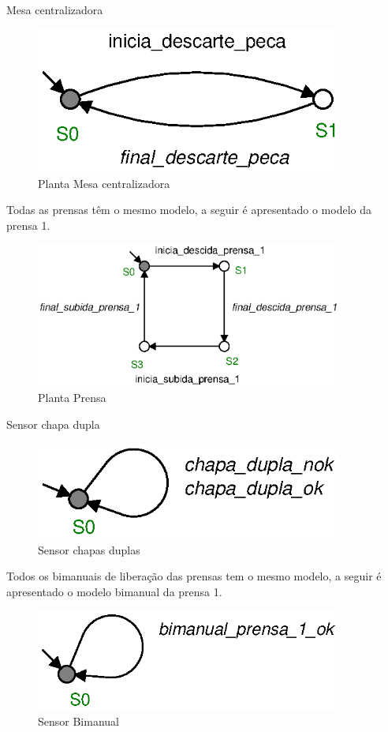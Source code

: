 Mesa centralizadora
\begin{figure}[H]%
    \centering
    \includegraphics[width=0.9\textwidth]{imagens/mesa_centralizadora.eps}
    \caption{Planta Mesa centralizadora}\label{fig:mesa}
\end{figure}

Todas as prensas têm o mesmo modelo, a seguir é apresentado o modelo da prensa 1.
\begin{figure}[H]%
    \centering
    \includegraphics[width=0.9\textwidth]{imagens/prensa_1.eps}
    \caption{Planta Prensa}\label{fig:prensa}
\end{figure}

Sensor chapa dupla
\begin{figure}[H]%
    \centering
    \includegraphics[width=0.9\textwidth]{imagens/sensor_chapa_dupla.eps}
    \caption{Sensor chapas duplas}\label{fig:chapadupla}
\end{figure}

Todos os bimanuais de liberação das prensas tem o mesmo modelo, a seguir é apresentado o modelo bimanual da prensa 1.
\begin{figure}[H]%
    \centering
    \includegraphics[width=0.9\textwidth]{imagens/bimanual_prensa_1.eps}
    \caption{Sensor Bimanual}\label{fig:bimanual}
\end{figure}

